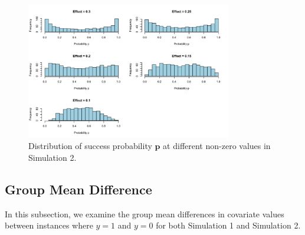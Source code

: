 \documentclass[12pt]{article}
\begin{document}
\begin{figure}[h!]
	\centering
	\includegraphics[width=0.8\textwidth]{sim2_p_dist.png}
  \caption{Distribution of success probability \( \mathbf{p} \) at different non-zero values in Simulation 2.}
	\label{fig:sim2_p_dist}
\end{figure}

\FloatBarrier

\subsection*{Group Mean Difference}

In this subsection, we examine the group mean differences in covariate values between instances where \( y = 1 \) and \( y = 0 \) for both Simulation 1 and Simulation 2.
\end{document}
